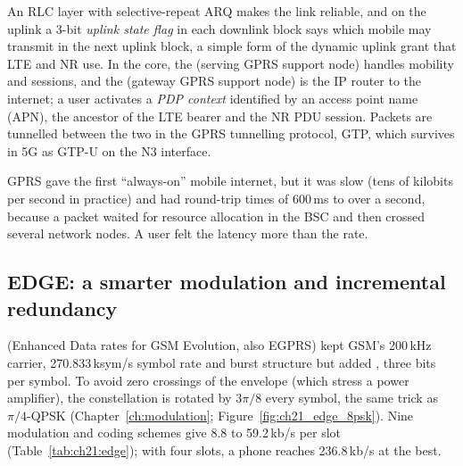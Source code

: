 An RLC layer with selective-repeat ARQ makes the link reliable, and on the uplink a 3-bit
\emph{uplink state flag} in each downlink block says which mobile may transmit in the next uplink
block, a simple form of the dynamic uplink grant that LTE and NR use. In the core, the 
(serving GPRS support node) handles mobility and sessions, and the  (gateway GPRS support
node) is the IP router to the internet; a user activates a \emph{PDP context} identified by an access
point name (APN), the ancestor of the LTE bearer and the NR PDU session. Packets are tunnelled between
the two in the GPRS tunnelling protocol, GTP, which survives in 5G as GTP-U on the N3 interface.

GPRS gave the first ``always-on'' mobile internet, but it was slow (tens of kilobits per second in
practice) and had round-trip times of 600\,ms to over a second, because a packet waited for resource
allocation in the BSC and then crossed several network nodes. A user felt the latency more than the
rate.


\subsection{EDGE: a smarter modulation and incremental redundancy}

 (Enhanced Data rates for GSM Evolution, also EGPRS) kept GSM's 200\,kHz carrier,
270.833\,ksym/s symbol rate and burst structure but added , three bits per symbol. To
avoid zero crossings of the envelope (which stress a power amplifier), the constellation is rotated
by $3\pi/8$ every symbol, the same trick as $\pi/4$-QPSK (Chapter~\ref{ch:modulation};
Figure~\ref{fig:ch21_edge_8psk}). Nine modulation and coding schemes give 8.8 to 59.2\,kb/s per slot
(Table~\ref{tab:ch21:edge}); with four slots, a phone reaches 236.8\,kb/s at the best.



